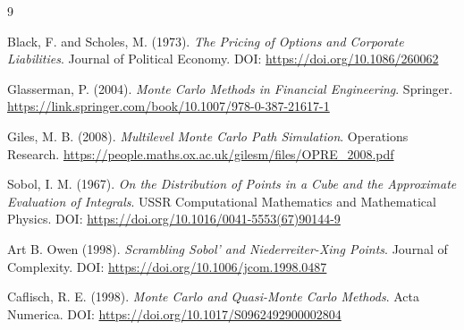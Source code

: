 \documentclass[11pt]{article}
\begin{document}
\begin{thebibliography}{9}

Black, F. and Scholes, M. (1973).
\textit{The Pricing of Options and Corporate Liabilities}.
Journal of Political Economy.
DOI: \url{https://doi.org/10.1086/260062}

Glasserman, P. (2004).
\textit{Monte Carlo Methods in Financial Engineering}.
Springer.
\url{https://link.springer.com/book/10.1007/978-0-387-21617-1}

Giles, M. B. (2008).
\textit{Multilevel Monte Carlo Path Simulation}.
Operations Research.
\url{https://people.maths.ox.ac.uk/gilesm/files/OPRE_2008.pdf}

Sobol, I. M. (1967).
\textit{On the Distribution of Points in a Cube and the Approximate Evaluation of Integrals}.
USSR Computational Mathematics and Mathematical Physics.
DOI: \url{https://doi.org/10.1016/0041-5553(67)90144-9}

Art B. Owen (1998).
\textit{Scrambling Sobol' and Niederreiter-Xing Points}.
Journal of Complexity.
DOI: \url{https://doi.org/10.1006/jcom.1998.0487}

Caflisch, R. E. (1998).
\textit{Monte Carlo and Quasi-Monte Carlo Methods}.
Acta Numerica.
DOI: \url{https://doi.org/10.1017/S0962492900002804}

\end{thebibliography}
\end{document}
